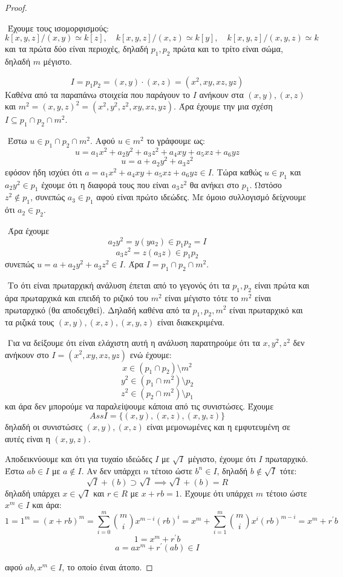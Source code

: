 \documentclass[oneside,a4paper]{article}
\begin{document}
\begin{proof} $ $

	$ $\newline
	Έχουμε τους ισομορφισμούς:
	$$k[x,y,z]/(x,y) \simeq k[z], \quad k[x,y,z]/(x,z) \simeq k[y], \quad k[x,y,z]/(x,y,z) \simeq k$$
	και τα πρώτα δύο είναι περιοχές, δηλαδή $p_1 ,p_2$ πρώτα και το τρίτο είναι σώμα, δηλαδή $m$ μέγιστο.

	$$I = p_1 p_2 = (x,y)\cdot(x,z) = (x^2 , xy,xz,yz)$$
	Καθένα από τα παραπάνω στοιχεία που παράγουν το $I$ ανήκουν στα $(x,y),(x,z)$ και $m^2 = (x,y,z)^2 = (x^2,y^2,z^2, xy,xz,yz)$. Άρα έχουμε την μια σχέση $I \subseteq p_1 \cap p_2 \cap m^2$.

	$ $\newline
	Έστω $u \in p_1 \cap p_2 \cap m^2$. Αφού $u \in m^2$ το γράφουμε ως:
	$$u = a_1 x^2 + a_2 y^2 + a_3 z^2 + a_4 xy + a_5 xz + a_6 yz$$
	$$u = a + a_2 y^2 + a_3 z^2$$
	εφόσον ήδη ισχύει ότι $a = a_1 x^2 + a_4 xy + a_5 xz + a_6 yz \in I$. Τώρα καθώς $u \in p_1$ και $a_2 y^2 \in p_1$ έχουμε ότι η διαφορά τους που είναι $a_3 z^2$ θα ανήκει στο $p_1$. Ωστόσο $z^2 \not\in p_1$, συνεπώς $a_3 \in p_1$ αφού είναι πρώτο ιδεώδες. Με όμοιο συλλογισμό δείχνουμε ότι $a_2 \in p_2$.

	$ $\newline
	Άρα έχουμε
	$$a_2 y^2 = y (ya_2) \in p_1 p_2 = I $$
	$$a_3 z^2 = z (a_3 z) \in p_1 p_2$$
	συνεπώς $u = a + a_2 y^2 + a_3 z^2 \in I$. Άρα $I = p_1 \cap p_2 \cap m^2$.

	$ $\newline
	Το ότι είναι πρωταρχική ανάλυση έπεται από το γεγονός ότι τα $p_1, p_2$ είναι πρώτα και άρα πρωταρχικά και επειδή το ριζικό του $m^2$ είναι μέγιστο τότε το $m^2$ είναι πρωταρχικό (θα αποδειχθεί). Δηλαδή καθένα από τα $p_1,p_2, m^2$ είναι πρωταρχικό και τα ριζικά τους $(x,y),(x,z),(x,y,z)$ είναι διακεκριμένα.

	$ $\newline
	Για να δείξουμε ότι είναι ελάχιστη αυτή η ανάλυση παρατηρούμε ότι τα $x,y^2,z^2$ δεν ανήκουν στο $I = (x^2,xy,xz,yz)$ ενώ έχουμε:
	$$x \in (p_1 \cap p_2) \setminus m^2$$
	$$y^2 \in (p_1 \cap m^2) \setminus p_2$$
	$$z^2 \in (p_2 \cap m^2) \setminus p_1$$
	και άρα δεν μπορούμε να παραλείψουμε κάποια από τις συνιστώσες. Έχουμε 
	$$AssI = \{(x,y),(x,z),(x,y,z)\}$$ 
	δηλαδή οι συνιστώσες $(x,y),(x,z)$ είναι μεμονωμένες και η εμφυτευμένη σε αυτές είναι η $(x,y,z)$.

	\pagebreak
	$ $\newline Αποδεικνύουμε και ότι για τυχαίο ιδεώδες $I$ με $\sqrt{I}$ μέγιστο, έχουμε ότι $I$ πρωταρχικό.
	Έστω $ab \in I$ με $a \not\in I$. Αν δεν υπάρχει $n$ τέτοιο ώστε $b^n \in I$, δηλαδή $b \not\in \sqrt{I}$ τότε:
	$$\sqrt{I} + (b) \supset \sqrt{I} \implies \sqrt{I} + (b) = R$$
	δηλαδή υπάρχει $x \in \sqrt{I}$ και $r \in R$ με $x+rb= 1$. Έχουμε ότι υπάρχει $m$ τέτοιο ώστε $x^m \in I$ και άρα:
	$$1 = 1^m = (x+rb)^m = \sum\limits_{i=0}^m \binom{m}{i} x^{m-i} (rb)^i = x^m + \sum\limits_{i=1}^m \binom{m}{i} x^i (rb)^{m-i} = x^m + r^{\prime}b$$
	$$1 = x^m + r^{\prime}b$$
	$$ a = ax^m + r^{\prime}(ab) \in I$$
	
	αφού $ab, x^m \in I$, το οποίο έιναι άτοπο.
\end{proof}
\end{document}

